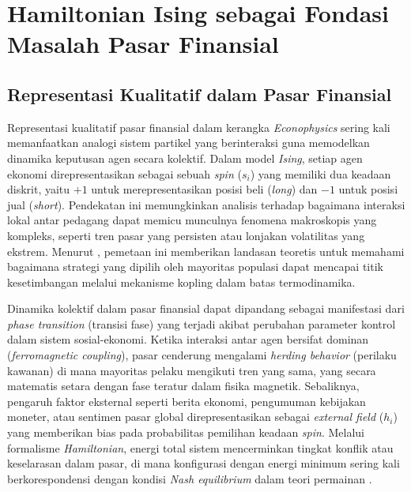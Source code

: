 \section{Hamiltonian Ising sebagai Fondasi Masalah Pasar Finansial}

\subsection{Representasi Kualitatif dalam Pasar Finansial}

Representasi kualitatif pasar finansial dalam kerangka \textit{Econophysics} sering kali memanfaatkan analogi sistem partikel yang berinteraksi guna memodelkan dinamika keputusan agen secara kolektif. Dalam model \textit{Ising}, setiap agen ekonomi direpresentasikan sebagai sebuah \textit{spin} ($s_i$) yang memiliki dua keadaan diskrit, yaitu $+1$ untuk merepresentasikan posisi beli (\textit{long}) dan $-1$ untuk posisi jual (\textit{short}). Pendekatan ini memungkinkan analisis terhadap bagaimana interaksi lokal antar pedagang dapat memicu munculnya fenomena makroskopis yang kompleks, seperti tren pasar yang persisten atau lonjakan volatilitas yang ekstrem. Menurut \cite{sarkar_quantum_2018}, pemetaan ini memberikan landasan teoretis untuk memahami bagaimana strategi yang dipilih oleh mayoritas populasi dapat mencapai titik kesetimbangan melalui mekanisme kopling dalam batas termodinamika.

Dinamika kolektif dalam pasar finansial dapat dipandang sebagai manifestasi dari \textit{phase transition} (transisi fase) yang terjadi akibat perubahan parameter kontrol dalam sistem sosial-ekonomi. Ketika interaksi antar agen bersifat dominan (\textit{ferromagnetic coupling}), pasar cenderung mengalami \textit{herding behavior} (perilaku kawanan) di mana mayoritas pelaku mengikuti tren yang sama, yang secara matematis setara dengan fase teratur dalam fisika magnetik. Sebaliknya, pengaruh faktor eksternal seperti berita ekonomi, pengumuman kebijakan moneter, atau sentimen pasar global direpresentasikan sebagai \textit{external field} ($h_i$) yang memberikan bias pada probabilitas pemilihan keadaan \textit{spin}. Melalui formalisme \textit{Hamiltonian}, energi total sistem mencerminkan tingkat konflik atau keselarasan dalam pasar, di mana konfigurasi dengan energi minimum sering kali berkorespondensi dengan kondisi \textit{Nash equilibrium} dalam teori permainan \cite{galam_ising_2010}.

